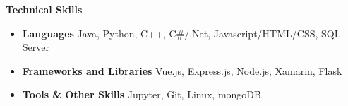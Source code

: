 \documentclass[letterpaper,12pt]{article}[leftmargin=*]
\def \entryspacing {-0pt}
\renewcommand{\section}[2]{\vspace{5pt}
  \colorbox{secondary}{\color{white}\raggedbottom\normalsize\textbf{{#1}{\hspace{7pt}#2}}}
}
\newcommand{\resumeEntryStart}{\begin{itemize}[leftmargin=2.5mm]}
\newcommand{\resumeEntryEnd}{\end{itemize}\vspace{\entryspacing}}
\newcommand{\resumeEntryS}[2]{
  \item[]\small{
    \textbf{\color{primary}#1 }{ #2 \vspace{-6pt}}
  }
}
\begin{document}
 


 


\section{\faGears}{Technical Skills}
 \resumeEntryStart
  \resumeEntryS{Languages } {Java, Python, C++, C\#/.Net, Javascript/HTML/CSS, SQL Server}
  \resumeEntryS{Frameworks and Libraries } {Vue.js, Express.js, Node.js, Xamarin, Flask}
  \resumeEntryS{Tools \& Other Skills }{ Jupyter, Git, Linux, mongoDB}
 \resumeEntryEnd
\end{document}
